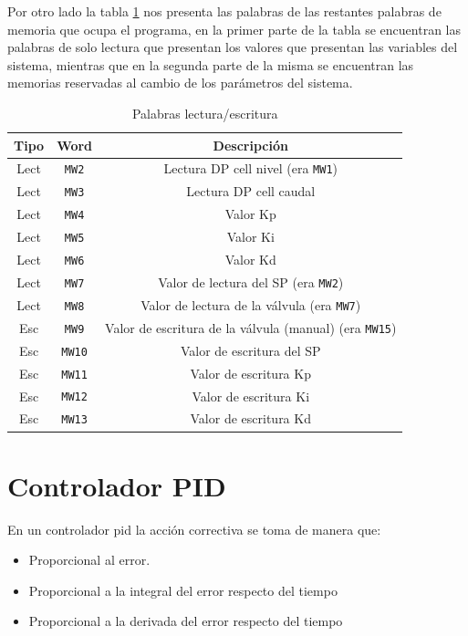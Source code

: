 Por otro lado la tabla \ref{table:palabraslecturasescrituras} nos presenta 
las palabras de las restantes palabras de memoria que ocupa el programa, en 
la primer parte de la tabla se encuentran las palabras de solo lectura que 
presentan los valores que presentan las variables del sistema, mientras que en la 
segunda parte de la misma se encuentran las memorias reservadas al cambio
de los parámetros del sistema.

\begin{table}[!t]

\renewcommand{\arraystretch}{1.3}
\centering
\begin{tabular}{c||c||c}
\hline
\bfseries Tipo & \bfseries Word  & \bfseries Descripción\\
\hline \hline
Lect & \verb|MW2|  & Lectura DP cell nivel (era \verb|MW1|)\\
Lect & \verb|MW3|  & Lectura DP cell caudal\\
Lect & \verb|MW4|  & Valor Kp\\
Lect & \verb|MW5|  & Valor Ki\\
Lect & \verb|MW6|  & Valor Kd\\
Lect & \verb|MW7|  & Valor de lectura del SP (era \verb|MW2|)\\
Lect & \verb|MW8|  & Valor de lectura de la válvula (era \verb|MW7|)\\
\hline
Esc & \verb|MW9| & Valor de escritura de la válvula (manual) (era 
\verb|MW15|) \\
Esc & \verb|MW10|  & Valor de escritura del SP \\
Esc & \verb|MW11|  & Valor de escritura Kp \\
Esc & \verb|MW12|  & Valor de escritura Ki \\
Esc & \verb|MW13| & Valor de escritura Kd \\
\hline
\end{tabular}
\caption{Palabras lectura/escritura}
\label{table:palabraslecturasescrituras}
\end{table}

\section{Controlador PID}
\label{sec:controladorpid}

En un controlador \gls{pid} la acción correctiva se toma de manera que:

\begin{itemize}
 \item Proporcional al error.
 \item Proporcional a la integral del error respecto del tiempo
 \item Proporcional a la derivada del error respecto del tiempo
\end{itemize}

